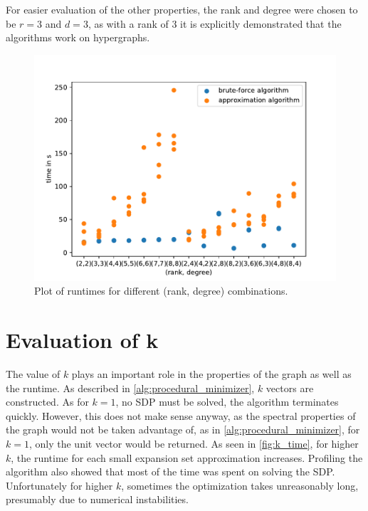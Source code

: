 For easier evaluation of the other properties, the rank and degree were chosen to be $r=3$ and $d=3$, as with a rank of $3$ it is explicitly demonstrated that the algorithms work on hypergraphs.
\begin{figure}
	\centering
	\includegraphics[scale=0.8]{figures/rank_degree_combinations_all_logs.pdf}
	\caption[Plot rank degree combinations against time]{Plot of runtimes for different (rank, degree) combinations.\label{fig:rank_degree_times}}
\end{figure}


\section{Evaluation of k}

The value of $k$ plays an important role in the properties of the graph as well as the runtime. As described in \cref{alg:procedural_minimizer}, $k$ vectors are constructed.
As for $k = 1$, no SDP must be solved, the algorithm terminates quickly. However, this does not make sense anyway, as the spectral properties of the graph would not be taken advantage of, as in \cref{alg:procedural_minimizer}, for $k=1$, only the unit vector would be returned.
As seen in \cref{fig:k_time}, for higher $k$, the runtime for each small expansion set approximation increases. Profiling the algorithm also showed that most of the time was spent on solving the SDP. Unfortunately for higher $k$, sometimes the optimization takes unreasonably long, presumably due to numerical instabilities.

